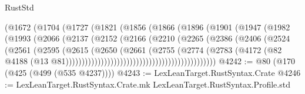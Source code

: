 \begin{lexlean}{RustStd}
\begin{coremodule}
{\begin{coremodule}
{{{{{{{{{{{{{{{{{{{{{{{{{{{{{{{{{{{{{{{{{{{{{{{{{{{{{{{                                    (@1672
                                      (@1704
                                        (@1727
                                          (@1821
                                            (@1856
                                              (@1866
                                                (@1896
                                                  (@1901
                                                    (@1947
                                                      (@1982
                                                        (@1993
                                                          (@2066
                                                            (@2137
                                                              (@2152
                                                                (@2166
                                                                  (@2210
                                                                    (@2265
                                                                      (@2386
                                                                        (@2406
                                                                          (@2524
                                                                            (@2561
                                                                              (@2595
                                                                                (@2615
                                                                                  (@2650
                                                                                    (@2661
                                                                                      (@2755
                                                                                        (@2774
                                                                                          (@2783
                                                                                            (@4172
                                                                                              (@82
                                                                                                @4188
                                                                                                (@13
                                                                                                  @81)))))))))))))))))))))))))))))))))))))))))))))))
@4242 := @80 (@170 (@425 (@499 (@535 @4237))))
@4243 := LexLeanTarget.RustSyntax.Crate
@4246 := LexLeanTarget.RustSyntax.Crate.mk LexLeanTarget.RustSyntax.Profile.std
}}}}}}}}}}}}}}}}}}}}}}}}}}}}}}}}}}}}}}}}}}}}}}}}}}}}}}}
\end{coremodule}}
\end{coremodule}
\end{lexlean}
